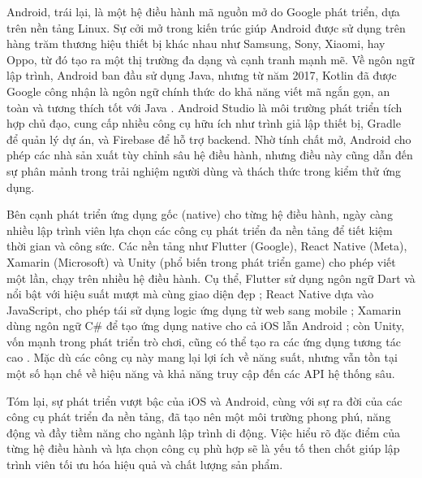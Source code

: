     \begin{flushleft}
      \hspace*{0.8cm}Android, trái lại, là một hệ điều hành mã nguồn mở do Google phát triển, dựa trên nền tảng Linux. Sự cởi mở trong kiến trúc giúp Android được sử dụng trên hàng trăm thương hiệu thiết bị khác nhau như Samsung, Sony, Xiaomi, hay Oppo, từ đó tạo ra một thị trường đa dạng và cạnh tranh mạnh mẽ. Về ngôn ngữ lập trình, Android ban đầu sử dụng Java, nhưng từ năm 2017, Kotlin đã được Google công nhận là ngôn ngữ chính thức do khả năng viết mã ngắn gọn, an toàn và tương thích tốt với Java \cite{kotlin}. Android Studio là môi trường phát triển tích hợp chủ đạo, cung cấp nhiều công cụ hữu ích như trình giả lập thiết bị, Gradle để quản lý dự án, và Firebase để hỗ trợ backend. Nhờ tính chất mở, Android cho phép các nhà sản xuất tùy chỉnh sâu hệ điều hành, nhưng điều này cũng dẫn đến sự phân mảnh trong trải nghiệm người dùng và thách thức trong kiểm thử ứng dụng.
    \end{flushleft}

    \begin{flushleft}
      \hspace*{0.8cm}Bên cạnh phát triển ứng dụng gốc (native) cho từng hệ điều hành, ngày càng nhiều lập trình viên lựa chọn các công cụ phát triển đa nền tảng để tiết kiệm thời gian và công sức. Các nền tảng như Flutter (Google), React Native (Meta), Xamarin (Microsoft) và Unity (phổ biến trong phát triển game) cho phép viết một lần, chạy trên nhiều hệ điều hành. Cụ thể, Flutter sử dụng ngôn ngữ Dart và nổi bật với hiệu suất mượt mà cùng giao diện đẹp \cite{flutter}; React Native dựa vào JavaScript, cho phép tái sử dụng logic ứng dụng từ web sang mobile \cite{reactnative}; Xamarin dùng ngôn ngữ C\# để tạo ứng dụng native cho cả iOS lẫn Android \cite{xamarin}; còn Unity, vốn mạnh trong phát triển trò chơi, cũng có thể tạo ra các ứng dụng tương tác cao \cite{unity}. Mặc dù các công cụ này mang lại lợi ích về năng suất, nhưng vẫn tồn tại một số hạn chế về hiệu năng và khả năng truy cập đến các API hệ thống sâu.
    \end{flushleft}

    \begin{flushleft}
      \hspace*{0.8cm}Tóm lại, sự phát triển vượt bậc của iOS và Android, cùng với sự ra đời của các công cụ phát triển đa nền tảng, đã tạo nên một môi trường phong phú, năng động và đầy tiềm năng cho ngành lập trình di động. Việc hiểu rõ đặc điểm của từng hệ điều hành và lựa chọn công cụ phù hợp sẽ là yếu tố then chốt giúp lập trình viên tối ưu hóa hiệu quả và chất lượng sản phẩm.
    \end{flushleft}